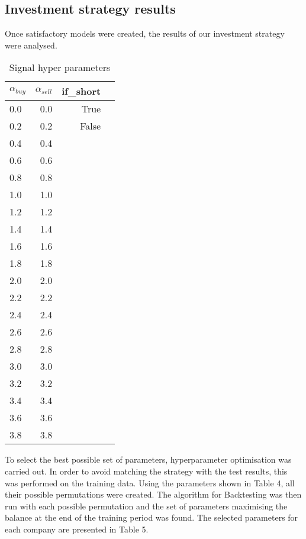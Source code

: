 \documentclass[11pt]{article} %
\begin{document}
\subsection{Investment strategy results}
Once satisfactory models were created, the results of our investment strategy were analysed. 
\begin{table}[H]
\centering
\caption{Signal hyper parameters}
\begin{tabular}{lrrl}
\toprule
  $\alpha_{buy}$ &  $\alpha_{sell}$  & if\_short \\
\midrule
        0.0 &           0.0 &     True \\
         0.2 &           0.2 &    False \\
         0.4 &           0.4  \\
         0.6 &           0.6  \\
          0.8 &           0.8  \\
          1.0 &           1.0  \\
          1.2 &           1.2  \\
          1.4 &           1.4  \\
          1.6 &           1.6  \\
          1.8 &           1.8  \\
         2.0 &           2.0  \\
          2.2 &           2.2  \\
          2.4 &           2.4  \\
          2.6 &           2.6  \\
          2.8 &           2.8  \\
          3.0 &           3.0  \\
          3.2 &           3.2  \\
          3.4 &           3.4  \\
          3.6 &           3.6  \\
          3.8 &           3.8  \\
\bottomrule
\end{tabular}
\end{table}

To select the best possible set of parameters, hyperparameter optimisation was carried out. In order to avoid matching the strategy with the test results, this was performed on the training data. Using the parameters shown in Table 4, all their possible permutations were created. The algorithm for Backtesting was then run with each possible permutation and the set of parameters maximising the balance at the end of the training period was found. The selected parameters for each company are presented in Table 5. 
\end{document}
